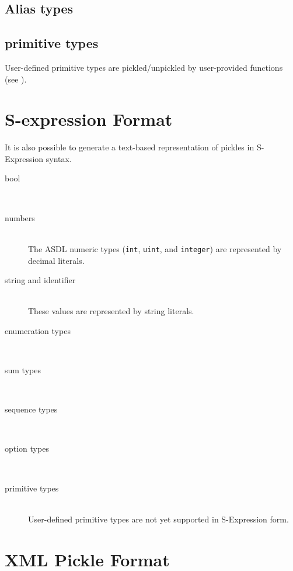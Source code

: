 \subsection{Alias types}

\subsection{primitive types}
User-defined primitive types are pickled/unpickled by user-provided functions (see
).

\section{S-expression Format}
It is also possible to generate a text-based representation of pickles in S-Expression
syntax.

\begin{description}
  \item[bool] \mbox{}\\

  \item[numbers] \mbox{}\\
    The ASDL numeric types (\lstinline!int!, \lstinline!uint!, and \lstinline!integer!)
    are represented by decimal literals.

  \item[string and identifier] \mbox{}\\
    These values are represented by string literals.

  \item[enumeration types] \mbox{}\\
    
  \item[sum types] \mbox{}\\

  \item[sequence types] \mbox{}\\

  \item[option types] \mbox{}\\

  \item[primitive types] \mbox{}\\
    User-defined primitive types are not yet supported in S-Expression form.
    
\end{description}%

\section{XML Pickle Format}

